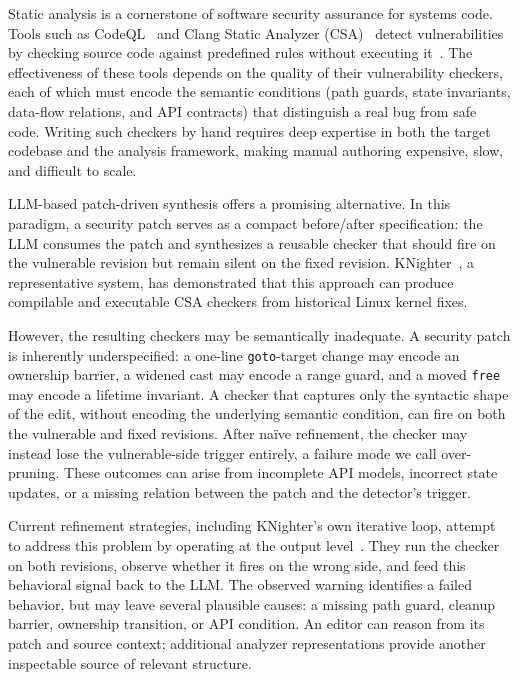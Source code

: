 Static analysis is a cornerstone of software security assurance for systems code.
Tools such as CodeQL~\cite{codeqlDocs} and Clang Static Analyzer (CSA)~\cite{clangsaDocs} detect vulnerabilities by checking source code against predefined rules without executing it~\cite{engler2001bugs,bessey2010coverity,calcagno2015infer,sadowski2015tricorder}.
The effectiveness of these tools depends on the quality of their vulnerability checkers, each of which must encode the semantic conditions (path guards, state invariants, data-flow relations, and API contracts) that distinguish a real bug from safe code.
Writing such checkers by hand requires deep expertise in both the target codebase and the analysis framework, making manual authoring expensive, slow, and difficult to scale.

LLM-based patch-driven synthesis offers a promising alternative.
In this paradigm, a security patch serves as a compact before/after specification: the LLM consumes the patch and synthesizes a reusable checker that should fire on the vulnerable revision but remain silent on the fixed revision.
KNighter~\cite{yang2025knighter}, a representative system, has demonstrated that this approach can produce compilable and executable CSA checkers from historical Linux kernel fixes.

However, the resulting checkers may be semantically inadequate.
A security patch is inherently underspecified: a one-line \texttt{goto}-target change may encode an ownership barrier, a widened cast may encode a range guard, and a moved \texttt{free} may encode a lifetime invariant.
A checker that captures only the syntactic shape of the edit, without encoding the underlying semantic condition, can fire on both the vulnerable and fixed revisions.
After na\"ive refinement, the checker may instead lose the vulnerable-side trigger entirely, a failure mode we call over-pruning.
These outcomes can arise from incomplete API models, incorrect state updates, or a missing relation between the patch and the detector's trigger.

Current refinement strategies, including KNighter's own iterative loop, attempt to address this problem by operating at the output level~\cite{yang2025knighter,madaan2023selfrefine,shinn2023reflexion}.
They run the checker on both revisions, observe whether it fires on the wrong side, and feed this behavioral signal back to the LLM.
The observed warning identifies a failed behavior, but may leave several plausible causes: a missing path guard, cleanup barrier, ownership transition, or API condition. An editor can reason from its patch and source context; additional analyzer representations provide another inspectable source of relevant structure.

